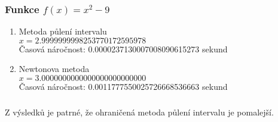 \documentclass[a4paper,12pt]{article}
\begin{document}
	\subsubsection{Funkce $f(x)=x^{2}-9$}
		\begin{enumerate}
			\item Metoda půlení intervalu\\$x=2.9999999998253770172595978$\\Časová náročnost: 0.0000237130007008090615273 sekund
			\item Newtonova metoda\\$x=3.0000000000000000000000000$\\Časová náročnost: 0.0011777550025726668536663 sekund
			\end{enumerate}
			
\subsubsection{}
Z výsledků je patrné, že ohraničená metoda půlení intervalu je pomalejší.
\end{document}
